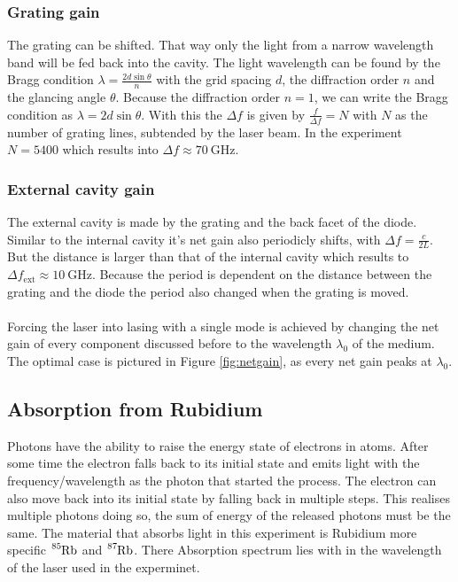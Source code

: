 \subsubsection{Grating gain}
The grating can be shifted.
That way only the light from a narrow wavelength band will be fed back into the cavity.
The light wavelength can be found by the Bragg condition $\lambda = \frac{2d \sin{\theta}}{n}$ with the grid spacing $d$, the diffraction order $n$ and the glancing angle $\theta$.
Because the diffraction order $n = 1$, we can write the Bragg condition as $\lambda = 2d\sin{\theta}$.
With this the $\Delta f$ is given by $\frac{f}{\Delta f} = N$ with $N$ as the number of grating lines, subtended by the laser beam.
In the experiment $N=5400$ which results into $\Delta f \approx \SI{70}{\giga\Hz}$.

\subsubsection{External cavity gain}
The external cavity is made by the grating and the back facet of the diode.
Similar to the internal cavity it's net gain also periodicly shifts, with $\Delta f = \frac{c}{2L}$.
\\
But the distance is larger than that of the internal cavity which results to $\Delta f_\text{ext} \approx \SI{10}{\giga\Hz}$.
Because the period is dependent on the distance between the grating and the diode the period also changed when the grating is moved.
\\\\
Forcing the laser into lasing with a single mode is achieved by changing the net gain of every component discussed before to the wavelength $\lambda_0$ of the medium.
The optimal case is pictured in Figure \ref{fig:netgain}, as every net gain peaks at $\lambda_0$.

\subsection{Absorption from Rubidium}
Photons have the ability to raise the energy state of electrons in atoms.
After some time the electron falls back to its initial state and emits light with the frequency/wavelength as the photon that started the process.
The electron can also move back into its initial state by falling back in multiple steps.
This realises multiple photons doing so, the sum of energy of the released photons must be the same.
The material that absorbs light in this experiment is Rubidium more specific $\ce{^{85}Rb}$ and $\ce{^{87}Rb}$.
There Absorption spectrum lies with in the wavelength of the laser used in the experminet.
